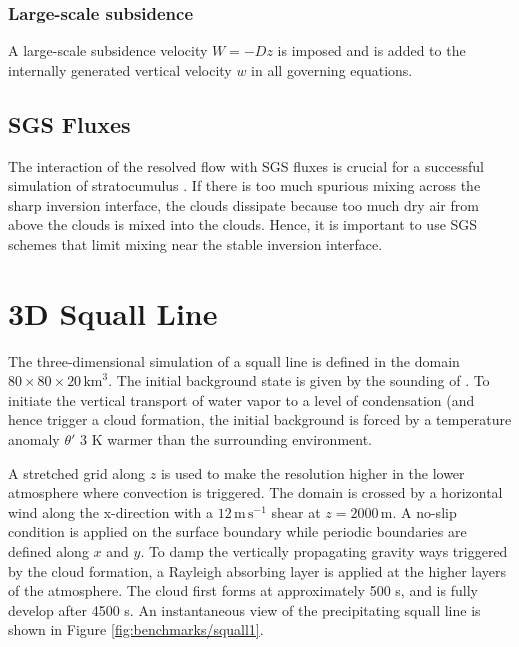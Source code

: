 \documentclass{report}
\begin{document}
\subsubsection{Large-scale subsidence}

A large-scale subsidence velocity $W=-Dz$ is imposed and is added to the internally generated vertical velocity $w$ in all governing equations. 

\subsection{SGS Fluxes}

The interaction of the resolved flow with SGS fluxes is crucial for a successful simulation of stratocumulus \citep{Pressel17a}. If there is too much spurious mixing across the sharp inversion interface, the clouds dissipate because too much dry air from above the clouds is mixed into the clouds. Hence, it is important to use SGS schemes that limit mixing near the stable inversion interface.

\section{3D Squall Line}
\label{sq3D}
The three-dimensional simulation of a squall line is defined in the domain 
$80\times 80\times20\,\mathrm{km}^3$. 
The initial background state is given by the sounding of \cite{gabersekGiraldoDoyle2012}.
To initiate the vertical transport of water vapor to a level of condensation (and hence trigger a cloud formation, the initial background is forced by a temperature anomaly $\theta'$ $3$ K warmer than the surrounding environment. 

A stretched grid along $z$ is used to make the resolution higher in the lower atmosphere where convection is triggered.
The domain is crossed by a horizontal wind along the x-direction with a $12\,\mathrm{m\,s^{-1}}$ shear at $z=2000\,\mathrm{m}$.
A no-slip condition is applied on the surface boundary while periodic boundaries are defined along $x$ and $y$. 
To damp the vertically propagating gravity ways triggered by the cloud formation, a Rayleigh absorbing layer is applied at the higher layers of the atmosphere.
The cloud first forms at approximately 500 s, and is fully develop after 4500 s. 
An instantaneous view of the precipitating squall line is shown in Figure \ref{fig:benchmarks/squall1}. 
\end{document}
